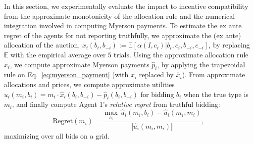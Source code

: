 \documentclass[format=acmsmall, review=false]{acmart}
\begin{document}
In this section, we experimentally evaluate the impact to incentive compatibility from the approximate monotonicity of the allocation rule and the numerical integration involved in computing Myerson payments. 
To estimate the ex ante regret of the agents for not reporting truthfully, we approximate the (ex ante) allocation of the auction, $x_i(b_i,b_{-i}):=\mathbb{E}\left[\alpha(I,c_i)|b_i,c_i,b_{-i},c_{-i}\right]$, by replacing $\mathbb{E}$ with the empirical average over $5$ trials. Using the approximate allocation rule $\hat x_i$, we compute approximate Myerson payments $\hat p_i$, by applying the trapezoidal rule on  Eq.~\eqref{eq:myerson_payment} (with $x_i$ replaced by $\hat x_i$). From approximate allocations and prices, we compute approximate utilities $\hat u_i(m_i, b_i)=m_i \cdot \hat x_i(b_i,b_{-i}) - \hat p_i(b_i,b_{-i})$ for bidding $b_i$ when the true type is $m_i$, and finally compute Agent 1's \emph{relative regret} from truthful bidding:
\begin{equation}
    \text{Regret}(m_i) = \frac{\max_{b_i} \, \hat u_i(m_i, b_i) - \hat u_i(m_i, m_i)}{|\hat u_i(m_i, m_i)|},
\end{equation}
maximizing over all bids on a grid.
\end{document}
